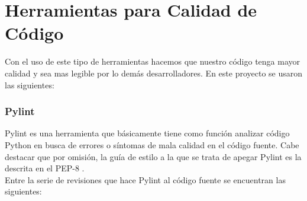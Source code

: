 \section{Herramientas para Calidad de Código}
\label{2:sec4}

Con el uso de este tipo de herramientas hacemos que nuestro código tenga mayor calidad y sea mas legible por lo demás desarrolladores. En este proyecto se usaron las siguientes:\\
\subsubsection{Pylint}
Pylint es una herramienta que básicamente tiene como función analizar código Python en busca de errores o síntomas de mala calidad en el código fuente.
Cabe destacar que por omisión, la guía de estilo a la que se trata de apegar Pylint es la descrita en el PEP-8 \cite{URL:PEP8}.\\ 

Entre la serie de revisiones que hace Pylint al código fuente se encuentran las siguientes:\\

